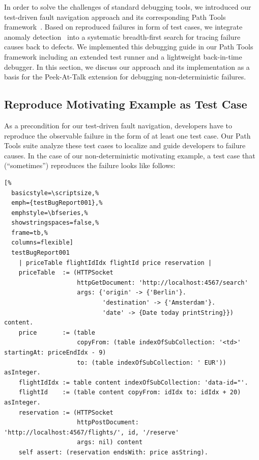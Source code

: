 \documentclass[preprint,3p]{elsarticle}
\newcommand{\toolname}{Peek-At-Talk\xspace}
\begin{document}
In order to solve the challenges of standard debugging tools, we introduced our test-driven fault navigation approach and its corresponding Path Tools framework~\cite{Perscheid13}.
Based on reproduced failures in form of test cases, we integrate anomaly detection~\cite{Jones2002Vti,Ernst2007Tds} into a systematic breadth-first search for tracing failure causes back to defects.
We implemented this debugging guide in our Path Tools framework including an extended test runner and a lightweight back-in-time debugger.
In this section, we discuss our approach and its implementation as a basis for the \toolname extension for debugging non-deterministic failures.


\subsection{Reproduce Motivating Example as Test Case}
\label{sec:bugreport}

As a precondition for our test-driven fault navigation, developers have to reproduce the observable failure in the form of at least one test case.
Our Path Tools suite analyze these test cases to localize and guide developers to failure causes.
In the case of our non-deterministic motivating example, a test case that (``sometimes'') reproduces the failure looks like follows:

\begin{lstlisting}[%
  basicstyle=\scriptsize,%
  emph={testBugReport001},%
  emphstyle=\bfseries,%
  showstringspaces=false,%
  frame=tb,%
  columns=flexible]
  testBugReport001
    | priceTable flightIdIdx flightId price reservation |
    priceTable  := (HTTPSocket
                    httpGetDocument: 'http://localhost:4567/search'
                    args: {'origin' -> {'Berlin'}.
                           'destination' -> {'Amsterdam'}.
                           'date' -> {Date today printString}}) content.
    price       := (table
                    copyFrom: (table indexOfSubCollection: '<td>' startingAt: priceEndIdx - 9)
                    to: (table indexOfSubCollection: ' EUR')) asInteger.
    flightIdIdx := table content indexOfSubCollection: 'data-id="'.
    flightId    := (table content copyFrom: idIdx to: idIdx + 20) asInteger.
    reservation := (HTTPSocket
                    httpPostDocument: 'http://localhost:4567/flights/', id, '/reserve'
                    args: nil) content
    self assert: (reservation endsWith: price asString).
\end{lstlisting}
\end{document}

